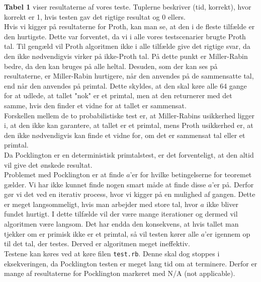 \textbf{Tabel 1} viser resultaterne af vores teste. Tuplerne beskriver (tid, korrekt), hvor korrekt er 1, hvis testen 
gav det rigtige resultat og 0 ellers.\\
Hvis vi kigger på resultaterne for Proth, kan man se, at den i de fleste tilfælde er den hurtigste. Dette var forventet,
da vi i alle vores testscenarier brugte Proth tal. Til gengæld vil Proth algoritmen ikke i alle tilfælde give det rigtige svar,
da den ikke nødvendigvis virker på ikke-Proth tal.  
På dette punkt er Miller-Rabin bedre, da den kan bruges på alle heltal. Desuden, som der kan ses på resultaterne, er Miller-Rabin hurtigere,
når den anvendes på de sammensatte tal, end når den anvendes på primtal. Dette skyldes, at den skal køre alle 64 gange for at udlede,
at tallet "nok" er et primtal, men at den returnerer med det samme, hvis den finder et vidne for at tallet er sammensat.\\
Forskellen mellem de to probabilistiske test er, at Miller-Rabins usikkerhed ligger i, at den ikke kan garantere, at tallet er et primtal,
mens Proth usikkerhed er, at den ikke nødvendigvis kan finde et vidne for, om det er sammensat tal eller et primtal.\\
Da Pocklington er en deterministisk primtalstest, er det forventeligt, at den altid vil give det ønskede resultat.\\
Problemet med Pocklington er at finde $a$'er for hvilke betingelserne for teoremet gælder. Vi har ikke kunnet
finde nogen smart måde at finde disse $a$'er på. Derfor gør vi det ved en iterativ process, hvor vi kigger på en mulighed
af gangen. Dette er meget langsommeligt, hvis man arbejder med store tal, hvor $a$ ikke bliver fundet hurtigt. I
dette tilfælde vil der være mange iterationer og dermed vil algoritmen være langsom.
Det har endda den konsekvens, at hvis tallet man tjekker om er primisk ikke er et primtal, så vil testen kører alle $a$'er igennem
op til det tal, der testes. Derved er algoritmen meget ineffektiv.\\
Testene kan køres ved at køre filen \texttt{test.rb}. Denne skal dog stoppes i eksekveringen, da Pocklington testen 
er meget lang tid om at terminere. Derfor er mange af resultaterne for Pocklington markeret med N/A (not applicable).
